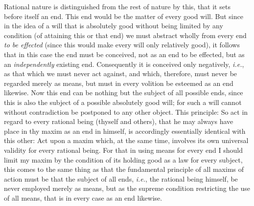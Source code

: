 Rational nature is distinguished from the rest of nature by this, that
it sets before itself an end. This end would be the matter of every
good will. But since in the idea of a will that is absolutely good
without being limited by any condition (of attaining this or that end)
we must abstract wholly from every end \textit{to be effected} (since
this would make every will only relatively good), it follows that in
this case the end must be conceived, not as an end to be effected, but
as an \textit{independently} existing end. Consequently it is
conceived only negatively, \textit{i.e.}, as that which we must never
act against, and which, therefore, must never be regarded merely as
means, but must in every volition be esteemed as an end likewise. Now
this end can be nothing but the subject of all possible ends, since
this is also the subject of a possible absolutely good will; for such
a will cannot without contradiction be postponed to any other object.
This principle: So act in regard to every rational being (thyself and
others), that he may always have place in thy maxim as an end in
himself, is accordingly essentially identical with this other: Act
upon a maxim which, at the same time, involves its own universal
validity for every rational being. For that in using means for every
end I should limit my maxim by the condition of its holding good as a
law for every subject, this comes to the same thing as that the
fundamental principle of all maxims of action must be that the subject
of all ends, \textit{i.e.}, the rational being himself, be never
employed merely as means, but as the supreme condition restricting the
use of all means, that is in every case as an end likewise.

